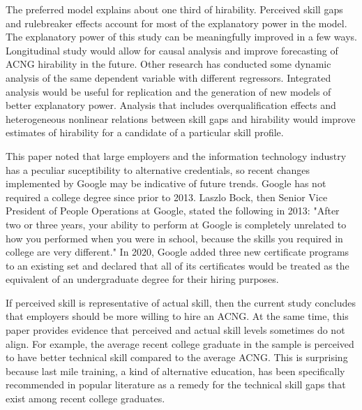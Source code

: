 \documentclass[review]{elsarticle}
\begin{document}
The preferred model explains about one third of hirability.
Perceived skill gaps and rulebreaker effects account for most of the explanatory power in the model.
The explanatory power of this study can be meaningfully improved in a few ways.
Longitudinal study would allow for causal analysis and improve forecasting of ACNG hirability in the future.
Other research has conducted some dynamic analysis of the same dependent variable with different regressors\cite{vandivier2020preliminary}.
Integrated analysis would be useful for replication and the generation of new models of better explanatory power.
Analysis that includes overqualification effects and heterogeneous nonlinear relations between skill gaps and hirability would improve estimates of hirability for a candidate of a particular skill profile.

This paper noted that large employers and the information technology industry has a peculiar suceptibility to alternative credentials,
so recent changes implemented by Google may be indicative of future trends.
Google has not required a college degree since prior to 2013\cite{bryant2013head}.
Laszlo Bock, then Senior Vice President of People Operations at Google, stated the following in 2013:
"After two or three years, your ability to perform at Google is completely unrelated to how you performed when you were in school, because the skills you required in college are very different."
In 2020, Google added three new certificate programs to an existing set and declared that all of its certificates would be treated as the equivalent of an undergraduate degree for their hiring purposes\cite{hess_2020}.

If perceived skill is representative of actual skill,
then the current study concludes that employers should be more willing to hire an ACNG.
At the same time, this paper provides evidence that perceived and actual skill levels sometimes do not align.
For example, the average recent college graduate in the sample is perceived to have better technical skill compared to the average ACNG.
This is surprising because last mile training, a kind of alternative education, has been specifically recommended in popular literature as a remedy for the technical skill gaps that exist among recent college graduates.
\end{document}
